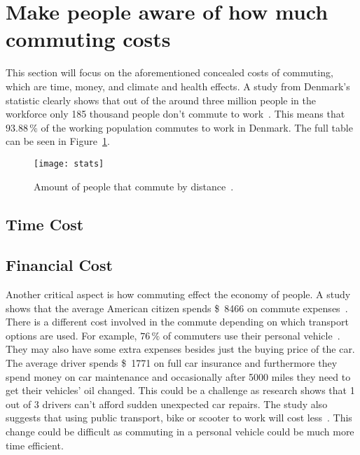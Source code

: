 \section{Make people aware of how much commuting costs}
\label{sec:make-people-aware-of-how-much-money-time-climate-they-are-using-on-commuting}

This section will focus on the aforementioned concealed costs of commuting, which are time, money, and climate and
health effects.
A study from Denmark’s statistic clearly shows that out of the around three million people in the workforce only
185 thousand people don't commute to work~\cite{erhvervspendling2021}.
This means that \(93.88\,\%\) of the working population commutes to work in Denmark.
The full table can be seen in Figure~\ref{fig:dst-commute}.

\begin{figure}
    \centering
    \texttt{[image: stats]}
    \caption{Amount of people that commute by distance~\cite{erhvervspendling2021}.}
    \label{fig:dst-commute}
\end{figure}

\subsection{Time Cost}\label{subsec:time-cost}


\subsection{Financial Cost}\label{subsec:financial-cost}

Another critical aspect is how commuting effect the economy of people.
A study shows that the average American citizen spends \SI{8466}[\$]{} on commute expenses~\cite{bankrate2023}.
There is a different cost involved in the commute depending on which transport options are used.
For example, \(76\,\%\) of commuters use their personal vehicle~\cite{bankrate2023}.
They may also have some extra expenses besides just the buying price of the car.
The average driver spends \SI{1771}[\$]{} on full car insurance and furthermore they spend money on car maintenance
and occasionally after 5000 miles they need to get their vehicles' oil changed.
This could be a challenge as research shows that 1 out of 3 drivers can't afford sudden unexpected car repairs.
The study also suggests that using public transport, bike or scooter to work will cost less~\cite{bankrate2023}.
This change could be difficult as commuting in a personal vehicle could be much more time efficient.

